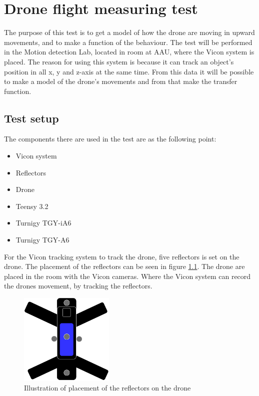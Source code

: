 \chapter{Drone flight measuring test}\label{ap:drone_flight_test}
The purpose of this test is to get a model of how the drone are moving in upward movements, and to make a function of the behaviour. The test will be performed in the Motion detection Lab, located in room  at AAU, where the Vicon system  is placed. The reason for using this system is because it can track an object's position in all x, y and z-axis at the same time. From this data it will be possible to make a model of the drone's movements and from that make the transfer function.

\section*{Test setup}
The components there are used in the test are as the following point:
\begin{itemize}
    \item{Vicon system}
    \item{Reflectors}
    \item{Drone}
    \item{Teensy 3.2} %
    \item{Turnigy TGY-iA6} %
    \item{Turnigy TGY-A6} %
\end{itemize}
For the Vicon tracking system to track the drone, five reflectors is set on the drone. The placement of the reflectors can be seen in figure \ref{fig:reflectors}.
The drone are placed in the room with the Vicon cameras. Where the Vicon system can record the drones movement, by tracking the reflectors. 

\begin{figure}[H]
    \centering
    \includegraphics[width=0.4\textwidth]{figures/Appendix/measuringTest/Reflector1.pdf}
    \caption{Illustration of placement of the reflectors on the drone}
    \label{fig:reflectors}
\end{figure}


